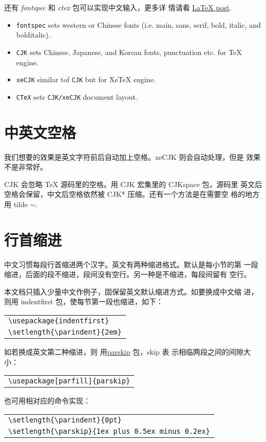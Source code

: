 还有 \textit{fontspec} 和 \textit{ctex} 包可以实现中文输入，更多详
情请看 \href{https://www.zhstar.win/2015/02/05/LaTeX/}{\LaTeX{}
  post}.

\begin{itemize}
\item \verb|fontspec| sets western or Chinese fonts (i.e. main, sans, serif, bold, italic, and bolditalic).
\item \verb|CJK| sets Chinese, Japanese, and Korean fonts, punctuation etc. for TeX engine.
\item \verb|xeCJK| similar tof \verb|CJK| but for XeTeX engine.
\item \verb|CTeX| sets \verb|CJK/xeCJK| document layout.
\end{itemize}

\section{中英文空格}
我们想要的效果是英文字符前后自动加上空格。xeCJK 则会自动处理，但是
效果不是非常好。

CJK 会忽略 \TeX{} 源码里的空格。用 CJK 宏集里的 CJKspace 包，源码里
英文后空格会保留，中文后空格依然被 CJK* 压缩。还有一个方法是在需要空
格的地方用 tilde $\sim$.

\section{行首缩进}

中文习惯每段行首缩进两个汉字。英文有两种缩进格式。默认是每小节的第
一段缩进，后面的段不缩进，段间没有空行。另一种是不缩进，每段间留有
空行。

本文档只插入少量中文作例子，固保留英文默认缩进方式。如要换成中文缩
进，则用 indentfirst 包，使每节第一段也缩进，如下：
\begin{center}
  \begin{tabular}{l}
    \verb|\usepackage{indentfirst}| \\
    \verb|\setlength{\parindent}{2em}|
  \end{tabular}
\end{center}
如若换成英文第二种缩进，则
用\href{https://tex.stackexchange.com/a/40432}{parskip} 包，skip 表
示相临两段之间的间隙大小：
\begin{center}
  \begin{tabular}{l}
    \verb|\usepackage[parfill]{parskip}|
  \end{tabular}
\end{center}
也可用相对应的命令实现：
\begin{center}
  \begin{tabular}{l}
    \verb|\setlength{\parindent}{0pt}| \\
    \verb|\setlength{\parskip}{1ex plus 0.5ex minus 0.2ex}|
  \end{tabular}
\end{center}


